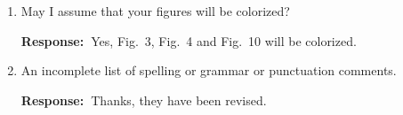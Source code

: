 \documentclass[a4paper, 11pt]{article}
\def\Response{\noindent \textbf{Response:~}}
\newcommand{\Question}[1]{\textcolor[rgb]{0.51,0.00,0.00}{#1}}
\begin{document}
\begin{enumerate}
      \Response Actually no specific constraints are applied, except the global clock constraint.
      
  \item \Question{May I assume that your figures will be colorized?}
        
      \Response Yes, Fig.~3, Fig.~4 and Fig.~10 will be colorized.
      
  \item \Question{An incomplete list of spelling or grammar or punctuation comments.}
      
      \Response Thanks, they have been revised.

      

\end{enumerate}
\end{document}
